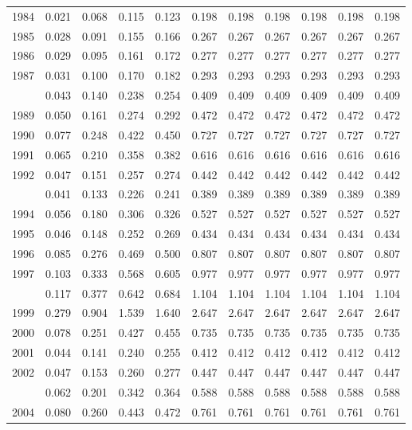 \documentclass[
]{article}
\begin{document}
\begin{longtable}[t]{lrrrrrrrrrr}
1984 & 0.021 & 0.068 & 0.115 & 0.123 & 0.198 & 0.198 & 0.198 & 0.198 & 0.198 & 0.198\\
1985 & 0.028 & 0.091 & 0.155 & 0.166 & 0.267 & 0.267 & 0.267 & 0.267 & 0.267 & 0.267\\
1986 & 0.029 & 0.095 & 0.161 & 0.172 & 0.277 & 0.277 & 0.277 & 0.277 & 0.277 & 0.277\\
1987 & 0.031 & 0.100 & 0.170 & 0.182 & 0.293 & 0.293 & 0.293 & 0.293 & 0.293 & 0.293\\
\addlinespace
1988 & 0.043 & 0.140 & 0.238 & 0.254 & 0.409 & 0.409 & 0.409 & 0.409 & 0.409 & 0.409\\
1989 & 0.050 & 0.161 & 0.274 & 0.292 & 0.472 & 0.472 & 0.472 & 0.472 & 0.472 & 0.472\\
1990 & 0.077 & 0.248 & 0.422 & 0.450 & 0.727 & 0.727 & 0.727 & 0.727 & 0.727 & 0.727\\
1991 & 0.065 & 0.210 & 0.358 & 0.382 & 0.616 & 0.616 & 0.616 & 0.616 & 0.616 & 0.616\\
1992 & 0.047 & 0.151 & 0.257 & 0.274 & 0.442 & 0.442 & 0.442 & 0.442 & 0.442 & 0.442\\
\addlinespace
1993 & 0.041 & 0.133 & 0.226 & 0.241 & 0.389 & 0.389 & 0.389 & 0.389 & 0.389 & 0.389\\
1994 & 0.056 & 0.180 & 0.306 & 0.326 & 0.527 & 0.527 & 0.527 & 0.527 & 0.527 & 0.527\\
1995 & 0.046 & 0.148 & 0.252 & 0.269 & 0.434 & 0.434 & 0.434 & 0.434 & 0.434 & 0.434\\
1996 & 0.085 & 0.276 & 0.469 & 0.500 & 0.807 & 0.807 & 0.807 & 0.807 & 0.807 & 0.807\\
1997 & 0.103 & 0.333 & 0.568 & 0.605 & 0.977 & 0.977 & 0.977 & 0.977 & 0.977 & 0.977\\
\addlinespace
1998 & 0.117 & 0.377 & 0.642 & 0.684 & 1.104 & 1.104 & 1.104 & 1.104 & 1.104 & 1.104\\
1999 & 0.279 & 0.904 & 1.539 & 1.640 & 2.647 & 2.647 & 2.647 & 2.647 & 2.647 & 2.647\\
2000 & 0.078 & 0.251 & 0.427 & 0.455 & 0.735 & 0.735 & 0.735 & 0.735 & 0.735 & 0.735\\
2001 & 0.044 & 0.141 & 0.240 & 0.255 & 0.412 & 0.412 & 0.412 & 0.412 & 0.412 & 0.412\\
2002 & 0.047 & 0.153 & 0.260 & 0.277 & 0.447 & 0.447 & 0.447 & 0.447 & 0.447 & 0.447\\
\addlinespace
2003 & 0.062 & 0.201 & 0.342 & 0.364 & 0.588 & 0.588 & 0.588 & 0.588 & 0.588 & 0.588\\
2004 & 0.080 & 0.260 & 0.443 & 0.472 & 0.761 & 0.761 & 0.761 & 0.761 & 0.761 & 0.761\\

\end{longtable}
\end{document}
